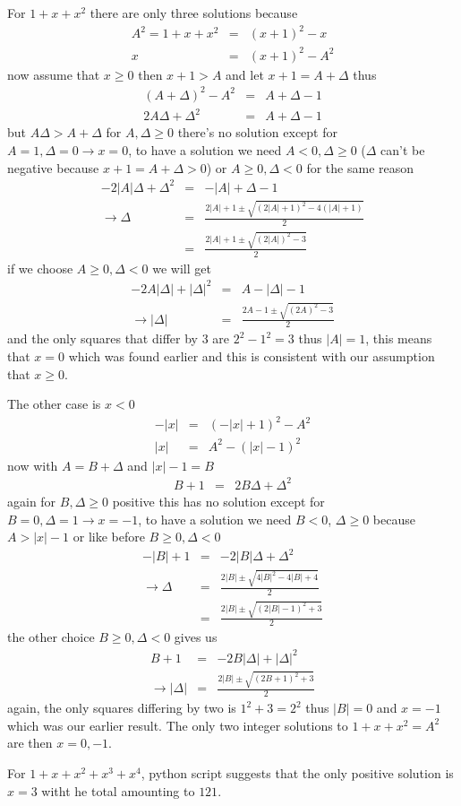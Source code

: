 \documentclass[aps,preprint,preprintnumbers,nofootinbib,showpacs,prd]{revtex4-1}
\newcommand{\nbea}{\begin{eqnarray*}}
\newcommand{\neea}{\end{eqnarray*}}
\begin{document}
For $1 + x + x^2$ there are only three solutions because
%
\nbea
A^2 = 1 + x + x^2 & = & (x + 1)^2 - x \\
x & = & (x + 1)^2 - A^2
\neea
%
now assume that $x \ge 0$ then $x + 1 > A$ and let $x + 1 = A + \Delta$ thus
%
\nbea
(A + \Delta)^2  - A^2 & = & A + \Delta - 1 \\
2A\Delta + \Delta^2 & = & A + \Delta - 1
\neea
%
but $A\Delta > A + \Delta$ for $A,\Delta \ge 0$ there's no solution except for $A = 1, \Delta = 0 \to x = 0$, to have a solution we need $A < 0, \Delta \ge 0$ ($\Delta$ can't be negative because $x + 1 = A + \Delta > 0$) or $A \ge 0, \Delta < 0$ for the same reason
%
\nbea
-2|A|\Delta + \Delta^2 & = & -|A| + \Delta - 1 \\
\to \Delta & = & \frac{2|A| + 1 \pm \sqrt{(2|A| + 1)^2 - 4(|A| + 1)}}{2} \\
& = & \frac{2|A| + 1 \pm \sqrt{(2|A|)^2 - 3}}{2} 
\neea
%
if we choose $A \ge 0, \Delta < 0$ we will get 
%
\nbea
-2A|\Delta| + |\Delta|^2 & = & A - |\Delta| - 1 \\
\to |\Delta| & = & \frac{2A - 1 \pm \sqrt{(2A)^2 - 3}}{2} 
\neea
%
and the only squares that differ by 3 are $2^2 - 1^2 = 3$ thus $|A| = 1$, this means that $x = 0$ which was found earlier and this is consistent with our assumption that $x \ge 0$.

The other case is $x < 0$
%
\nbea
-|x| & = & (-|x| + 1)^2 - A^2 \\
|x| & = & A^2 - (|x| - 1)^2
\neea
%
now with $A = B + \Delta$ and $|x| - 1 = B$
%
\nbea
B + 1 & = & 2B\Delta + \Delta^2
\neea
%
again for $B,\Delta \ge 0$ positive this has no solution except for $B = 0, \Delta = 1 \to x = -1$, to have a solution we need $B < 0$, $\Delta \ge 0$ because $A > |x| - 1$ or like before $B \ge 0, \Delta < 0$
%
\nbea
-|B| + 1 & = & -2|B|\Delta + \Delta^2 \\
\to \Delta & = & \frac{2|B| \pm \sqrt{4|B|^2 - 4|B| + 4}}{2} \\
& = & \frac{2|B| \pm \sqrt{(2|B| - 1)^2 + 3}}{2}
\neea
%
the other choice $B \ge 0, \Delta < 0$ gives us
%
\nbea
B + 1 & = & -2B|\Delta| + |\Delta|^2 \\
\to |\Delta| & = & \frac{2|B| \pm \sqrt{(2B + 1)^2 + 3}}{2}
\neea
%
again, the only squares differing by two is $1^2 + 3 = 2^2$ thus $|B| = 0$ and $x = -1$ which was our earlier result. The only two integer solutions to $1 + x + x^2 = A^2$ are then $x = 0,-1$.

For $1 + x + x^2 + x^3 + x^4$, python script suggests that the only positive solution is $x = 3$ witht he total amounting to $121$.
\end{document}

